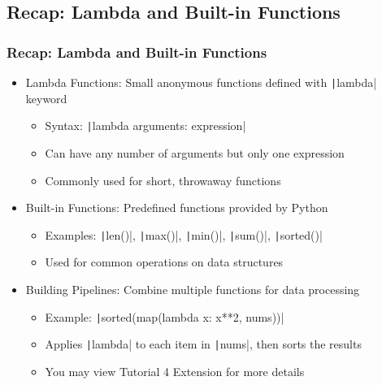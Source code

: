 \documentclass{beamer}
\newcommand{\python}[1]{\texttt|#1|}
\begin{document}
\subsection{Recap: Lambda and Built-in Functions}
\begin{frame}
    \frametitle{Recap: Lambda and Built-in Functions}
    \begin{itemize}
        \item Lambda Functions: Small anonymous functions defined with \python{lambda} keyword
              \begin{itemize}
                  \item Syntax: \python{lambda arguments: expression}
                  \item Can have any number of arguments but only one expression
                  \item Commonly used for short, throwaway functions
              \end{itemize}
        \item Built-in Functions: Predefined functions provided by Python
              \begin{itemize}
                  \item Examples: \python{len()}, \python{max()}, \python{min()}, \python{sum()}, \python{sorted()}
                  \item Used for common operations on data structures
              \end{itemize}
        \item Building Pipelines: Combine multiple functions for data processing
              \begin{itemize}
                  \item Example: \python{sorted(map(lambda x: x**2, nums))}
                  \item Applies \python{lambda} to each item in \python{nums}, then sorts the results
                  \item You may view Tutorial 4 Extension for more details
              \end{itemize}
    \end{itemize}
\end{frame}
\end{document}
